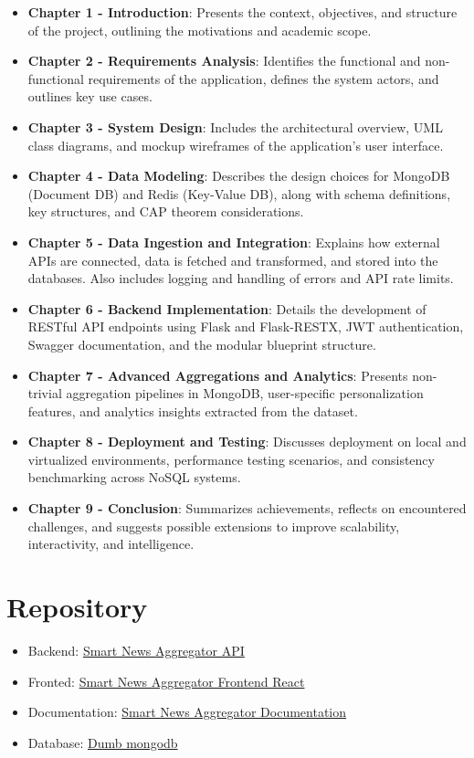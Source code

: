 \begin{itemize}
    \item \textbf{Chapter 1 - Introduction}: Presents the context, objectives, and structure of the project, outlining the motivations and academic scope.
    \item \textbf{Chapter 2 - Requirements Analysis}: Identifies the functional and non-functional requirements of the application, defines the system actors, and outlines key use cases.
    \item \textbf{Chapter 3 - System Design}: Includes the architectural overview, UML class diagrams, and mockup wireframes of the application’s user interface.
    \item \textbf{Chapter 4 - Data Modeling}: Describes the design choices for MongoDB (Document DB) and Redis (Key-Value DB), along with schema definitions, key structures, and CAP theorem considerations.
    \item \textbf{Chapter 5 - Data Ingestion and Integration}: Explains how external APIs are connected, data is fetched and transformed, and stored into the databases.
    Also includes logging and handling of errors and API rate limits.
    \item \textbf{Chapter 6 - Backend Implementation}: Details the development of RESTful API endpoints using Flask and Flask-RESTX, JWT authentication, Swagger documentation, and the modular blueprint structure.
    \item \textbf{Chapter 7 - Advanced Aggregations and Analytics}: Presents non-trivial aggregation pipelines in MongoDB, user-specific personalization features, and analytics insights extracted from the dataset.
    \item \textbf{Chapter 8 - Deployment and Testing}: Discusses deployment on local and virtualized environments, performance testing scenarios, and consistency benchmarking across NoSQL systems.
    \item \textbf{Chapter 9 - Conclusion}: Summarizes achievements, reflects on encountered challenges, and suggests possible extensions to improve scalability, interactivity, and intelligence.
\end{itemize}


\section{Repository}\label{sec:repository}

\begin{itemize}
    \item Backend: \href{https://github.com/adrienKoumgangT/smart-news-aggregator-api}{Smart News Aggregator API}
    \item Fronted: \href{https://github.com/adrienKoumgangT/smart-news-aggregator-fe-react}{Smart News Aggregator Frontend React}
    \item Documentation: \href{https://github.com/adrienKoumgangT/smart-news-aggregator-documentation}{Smart News Aggregator Documentation}
    \item Database: \href{https://drive.google.com/file/d/12bA16QeyY0o3gxH9-6FVyzYFH3b3lpeV/view?usp=share_link}{Dumb mongodb}
\end{itemize}

